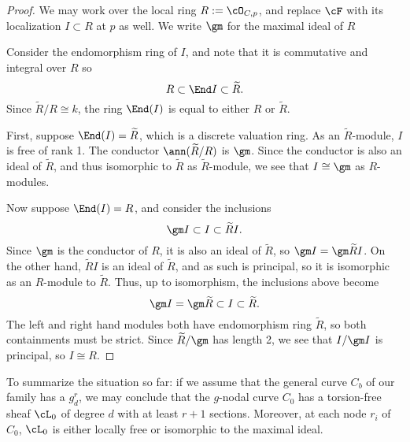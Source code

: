 \begin{proof} We may work over the local ring $R := \cO_{C,p}$, and replace $\cF$ with 
its localization $I\subset R$ at $p$ as well. We write
$\gm$ for the maximal ideal of $R$

Consider the endomorphism ring of $I$, and note that it is commutative and integral over $R$ so 
$$
R \subset \End I \subset \widetilde R.
$$
Since
$\widetilde R/R \cong k$, the ring $\End(I)$ is equal to either 
$R$ or $\widetilde R$. 

First, suppose
$\End(I)=\widetilde R$, which is a discrete valuation ring.
 As an 
$\widetilde R$-module, $I$ is free of rank 1.  The conductor
$\ann(\widetilde R/R)$ is $\gm$.
Since the conductor is also an ideal of $\widetilde R$, and thus isomorphic to $\widetilde R$
as $\widetilde R$-module,
we see that $I \cong \gm$ as $R$-modules.

Now suppose
$\End(I)=R$, and consider the inclusions
$$
\gm I \subset I \subset \widetilde R I.
$$
Since $\gm$ is the conductor of $R$, it is also an ideal of $\widetilde R$, so
$\gm I = \gm \widetilde R I$. On the other hand, $\widetilde R I$ is an ideal of $\widetilde R$,
and as such is principal, so it is isomorphic as an $R$-module to $\widetilde R$. Thus, up to 
isomorphism, the inclusions above become
$$
\gm I = \gm \widetilde R \subset I \subset \widetilde R.
$$
The left and right hand modules both have endomorphism ring $\widetilde R$,
so both containments must be strict. Since $\widetilde R/\gm$ has length 2,
we see that $I/\gm I$ is principal, so $I\cong R$.
\end{proof}

To summarize the situation so far: if we assume that the general curve $C_b$ of our family has a $g^r_d$, we may conclude that the $g$-nodal curve $C_0$ has a torsion-free sheaf $\cL_0$ of degree $d$ with at least $r+1$ sections. Moreover, at each node $r_i$ of $C_0$, $\cL_0$ is either locally free or isomorphic to the maximal ideal. 



